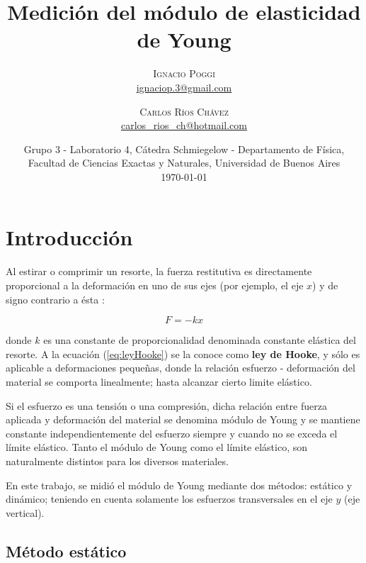 \documentclass[twoside,twocolumn,a4paper]{article}
\title{Medici\'on del m\'odulo de elasticidad de Young} %
\author{%
\textsc{Ignacio Poggi} \\[1ex] %
\normalsize \href{mailto:ignaciop.3@gmail.com}{ignaciop.3@gmail.com} %
\and %
\textsc{Carlos R\'ios Ch\'avez} \\[1ex] %
\normalsize \href{mailto:carlos_rios_ch@hotmail.com}{carlos\_rios\_ch@hotmail.com} %
}
\date{Grupo 3 - Laboratorio 4, C\'atedra Schmiegelow - Departamento de F\'isica, Facultad de Ciencias Exactas y Naturales, Universidad de Buenos Aires \newline \\ \today} %
\begin{document}
\maketitle



\section{Introducci\'on}

Al estirar o comprimir un resorte, la fuerza restitutiva es directamente proporcional a la deformaci\'on en uno de sus ejes (por ejemplo, el eje $x$) y de signo contrario a \'esta \cite{eq:leyHooke}:

\begin{equation}
\label{eq:leyHooke}
F = -kx
\end{equation}

donde $k$ es una constante de proporcionalidad denominada constante el\'astica del resorte.
A la ecuaci\'on (\ref{eq:leyHooke}) se la conoce como \textbf{ley de Hooke}, y s\'olo es aplicable a deformaciones peque\~nas, donde la relaci\'on esfuerzo - deformaci\'on del material se comporta linealmente; hasta alcanzar cierto limite el\'astico. \newline

\par Si el esfuerzo es una tensi\'on o una compresi\'on, dicha relaci\'on entre fuerza aplicada y deformaci\'on del material se denomina m\'odulo de Young y se mantiene constante independientemente del esfuerzo siempre y cuando no se exceda el l\'imite el\'astico. Tanto el m\'odulo de Young como el l\'imite el\'astico, son naturalmente distintos para los diversos materiales. \newline

\par En este trabajo, se midi\'o el m\'odulo de Young mediante dos m\'etodos: est\'atico y din\'amico; teniendo en cuenta solamente los esfuerzos transversales en el eje $y$ (eje vertical). \newline

\subsection{M\'etodo est\'atico}
\end{document}
